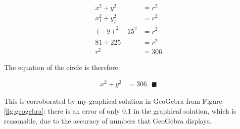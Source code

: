 \documentclass[12pt]{article}
\begin{document}
\begin{equation}\begin{split}
x^2 + y^2 &= r^2\\
x_I^2 + y_I^2 &= r^2\\
(-9)^2 + 15^2 &= r^2\\
81 + 225 &= r^2\\
r^2 &= 306
\end{split}\end{equation}

The equation of the circle is therefore:

\begin{equation}\begin{split}
x^2 + y^2 &= 306\text{ }\blacksquare
\end{split}\end{equation}

This is corroborated by my graphical solution in GeoGebra from Figure \ref{fig:geogebra}: there is an error of only $0.1$ in the graphical solution, which is reasonable, due to the accuracy of numbers that GeoGebra displays.
\end{document}
